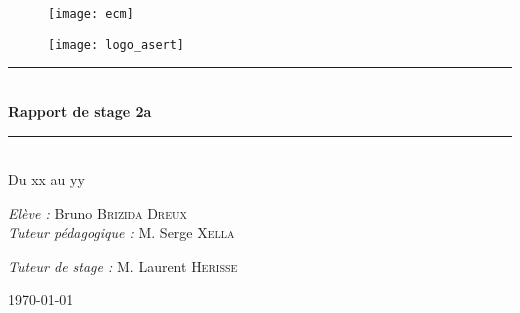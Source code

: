 \begin{titlepage}
\begin{center}

\begin{figure}[ht]
\begin{minipage}[b]{0.5\linewidth}
\centering
\texttt{[image: ecm]}
\label{logo_ecm}
\end{minipage}
\hspace{0.5cm}
\begin{minipage}[b]{0.5\linewidth}
\centering
\texttt{[image: logo\_asert]}
\label{logo_asert}
\end{minipage}
\end{figure}



\vspace{2cm}
\hrule  ~\\[0.4cm]
{ \huge \bfseries Rapport de stage 2a}\\[0.4cm]

\hrule  ~\\[1.5cm]
\large Du xx au yy

\vspace{4cm}
\large\emph{Elève :} Bruno \textsc{Brizida Dreux} ~\\
\vspace{0.5cm}
\large\emph{Tuteur pédagogique :} M. Serge \textsc{Xella}

\large\emph{Tuteur de stage :} M. Laurent \textsc{Herisse}




\vfill

{\large\today}

\end{center}

\end{titlepage}
